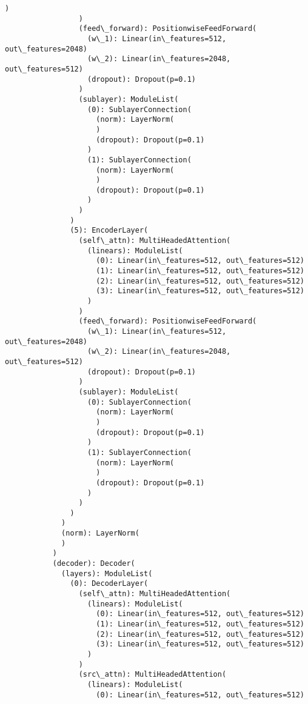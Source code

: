 \documentclass[11pt]{article}
\begin{document}
\begin{Verbatim}[commandchars=\\\{\}]
                   )
                 )
                 (feed\_forward): PositionwiseFeedForward(
                   (w\_1): Linear(in\_features=512, out\_features=2048)
                   (w\_2): Linear(in\_features=2048, out\_features=512)
                   (dropout): Dropout(p=0.1)
                 )
                 (sublayer): ModuleList(
                   (0): SublayerConnection(
                     (norm): LayerNorm(
                     )
                     (dropout): Dropout(p=0.1)
                   )
                   (1): SublayerConnection(
                     (norm): LayerNorm(
                     )
                     (dropout): Dropout(p=0.1)
                   )
                 )
               )
               (5): EncoderLayer(
                 (self\_attn): MultiHeadedAttention(
                   (linears): ModuleList(
                     (0): Linear(in\_features=512, out\_features=512)
                     (1): Linear(in\_features=512, out\_features=512)
                     (2): Linear(in\_features=512, out\_features=512)
                     (3): Linear(in\_features=512, out\_features=512)
                   )
                 )
                 (feed\_forward): PositionwiseFeedForward(
                   (w\_1): Linear(in\_features=512, out\_features=2048)
                   (w\_2): Linear(in\_features=2048, out\_features=512)
                   (dropout): Dropout(p=0.1)
                 )
                 (sublayer): ModuleList(
                   (0): SublayerConnection(
                     (norm): LayerNorm(
                     )
                     (dropout): Dropout(p=0.1)
                   )
                   (1): SublayerConnection(
                     (norm): LayerNorm(
                     )
                     (dropout): Dropout(p=0.1)
                   )
                 )
               )
             )
             (norm): LayerNorm(
             )
           )
           (decoder): Decoder(
             (layers): ModuleList(
               (0): DecoderLayer(
                 (self\_attn): MultiHeadedAttention(
                   (linears): ModuleList(
                     (0): Linear(in\_features=512, out\_features=512)
                     (1): Linear(in\_features=512, out\_features=512)
                     (2): Linear(in\_features=512, out\_features=512)
                     (3): Linear(in\_features=512, out\_features=512)
                   )
                 )
                 (src\_attn): MultiHeadedAttention(
                   (linears): ModuleList(
                     (0): Linear(in\_features=512, out\_features=512)

\end{Verbatim}
\end{document}

